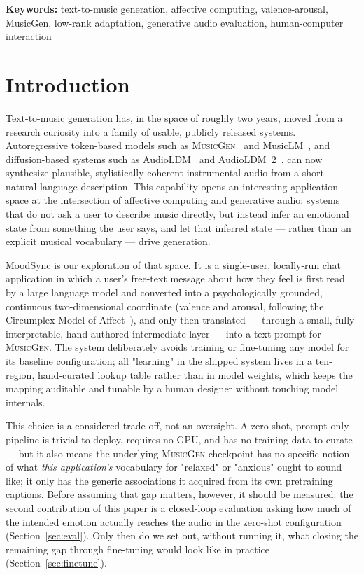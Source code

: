 \documentclass[11pt]{article}
\newcommand{\musicgen}{\textsc{MusicGen}}
\begin{document}
\vspace{0.5em}
\noindent\textbf{Keywords:} text-to-music generation, affective computing, valence-arousal, MusicGen, low-rank adaptation, generative audio evaluation, human-computer interaction

\section{Introduction}

Text-to-music generation has, in the space of roughly two years, moved from a research curiosity into a family of usable, publicly released systems. Autoregressive token-based models such as \musicgen{}~\cite{copet2023musicgen} and MusicLM~\cite{agostinelli2023musiclm}, and diffusion-based systems such as AudioLDM~\cite{liu2023audioldm} and AudioLDM~2~\cite{liu2024audioldm2}, can now synthesize plausible, stylistically coherent instrumental audio from a short natural-language description. This capability opens an interesting application space at the intersection of affective computing and generative audio: systems that do not ask a user to describe music directly, but instead infer an emotional state from something the user says, and let that inferred state --- rather than an explicit musical vocabulary --- drive generation.

MoodSync is our exploration of that space. It is a single-user, locally-run chat application in which a user's free-text message about how they feel is first read by a large language model and converted into a psychologically grounded, continuous two-dimensional coordinate (valence and arousal, following the Circumplex Model of Affect~\cite{russell1980circumplex}), and only then translated --- through a small, fully interpretable, hand-authored intermediate layer --- into a text prompt for \musicgen{}. The system deliberately avoids training or fine-tuning any model for its baseline configuration; all "learning" in the shipped system lives in a ten-region, hand-curated lookup table rather than in model weights, which keeps the mapping auditable and tunable by a human designer without touching model internals.

This choice is a considered trade-off, not an oversight. A zero-shot, prompt-only pipeline is trivial to deploy, requires no GPU, and has no training data to curate --- but it also means the underlying \musicgen{} checkpoint has no specific notion of what \emph{this application's} vocabulary for "relaxed" or "anxious" ought to sound like; it only has the generic associations it acquired from its own pretraining captions. Before assuming that gap matters, however, it should be measured: the second contribution of this paper is a closed-loop evaluation asking how much of the intended emotion actually reaches the audio in the zero-shot configuration (Section~\ref{sec:eval}). Only then do we set out, without running it, what closing the remaining gap through fine-tuning would look like in practice (Section~\ref{sec:finetune}).
\end{document}
